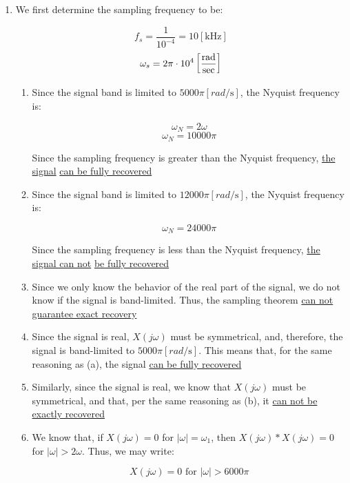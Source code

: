 \begin{enumerate}

  \item We first determine the sampling frequency to be:

    $$f_s=\frac{1}{10^{-4}}=10[\si{\kilo\hertz}]$$
    $$\omega_s=2\pi\cdot10^4\left[\si{rad\over\sec}\right]$$

    \begin{enumerate}

      \item Since the signal band is limited to $5000\pi[\si{rad\per\second}]$, the Nyquist frequency is:

        $$\omega_N=2\omega$$
        $$\omega_N=10000\pi$$

        Since the sampling frequency is greater than the Nyquist frequency, \underline{the signal} \underline{can be fully recovered}
        
      \item Since the signal band is limited to $12000\pi[\si{rad\per\second}]$, the Nyquist frequency is:

        $$\omega_N=24000\pi$$

        Since the sampling frequency is less than the Nyquist frequency, \underline{the signal can not} \underline{be fully recovered}

      \item Since we only know the behavior of the real part of the signal, we do not know if the signal is band-limited. Thus, the sampling theorem \underline{can not guarantee exact recovery}
        
      \item Since the signal is real, $X(j\omega)$ must be symmetrical, and, therefore, the signal is band-limited to $5000\pi[\si{rad\per\second}]$. This means that, for the same reasoning as (a), the signal \underline{can be fully recovered}
        
      \item Similarly, since the signal is real, we know that $X(j\omega)$ must be symmetrical, and that, per the same reasoning as (b), it \underline{can not be exactly recovered}
        
      \item We know that, if $X(j\omega)=0$ for $|\omega|=\omega_1$, then $X(j\omega)*X(j\omega)=0$ for $|\omega|>2\omega$. Thus, we may write:

        $$X(j\omega)=0\text{  for  }|\omega|>6000\pi$$


\end{enumerate}
\end{enumerate}
